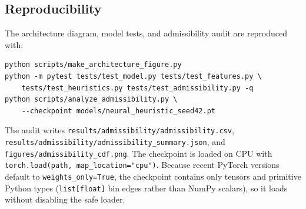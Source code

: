 \subsection{Reproducibility}
The architecture diagram, model tests, and admissibility audit are reproduced
with:
\begin{verbatim}
python scripts/make_architecture_figure.py
python -m pytest tests/test_model.py tests/test_features.py \
    tests/test_heuristics.py tests/test_admissibility.py -q
python scripts/analyze_admissibility.py \
    --checkpoint models/neural_heuristic_seed42.pt
\end{verbatim}
The audit writes \texttt{results/admissibility/admissibility.csv},
\texttt{results/admissibility/admissibility\_summary.json}, and
\texttt{figures/admissibility\_cdf.png}. The checkpoint is loaded on CPU with
\texttt{torch.load(path, map\_location="cpu")}. Because recent PyTorch versions
default to \texttt{weights\_only=True}, the checkpoint contains only tensors and
primitive Python types (\texttt{list[float]} bin edges rather than NumPy
scalars), so it loads without disabling the safe loader.
